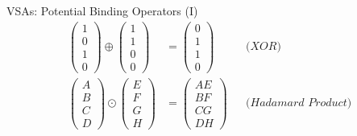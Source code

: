\documentclass[handout,aspectratio=169]{beamer}
\begin{document}
	\begin{frame}{VSAs: Potential Binding Operators (I)}
		\begin{align*}
		\begin{pmatrix}1 \\ 0 \\ 1 \\ 0\end{pmatrix} \oplus \begin{pmatrix}1 \\ 1 \\ 0 \\ 0\end{pmatrix} &= \begin{pmatrix}0 \\ 1 \\ 1 \\ 0\end{pmatrix} && \textit{(XOR)}\\
		\begin{pmatrix}A \\ B \\ C \\ D\end{pmatrix} \odot \begin{pmatrix}E \\ F \\ G \\ H\end{pmatrix} &= \begin{pmatrix}AE \\ BF \\ CG \\ DH\end{pmatrix} && \textit{(Hadamard Product)}
		\end{align*}
	\end{frame}
\end{document}
